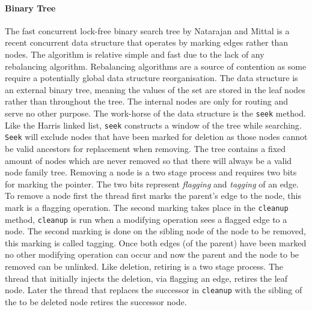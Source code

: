 \paragraph{Binary Tree} The fast concurrent lock-free binary search tree by Natarajan and Mittal is a recent concurrent data structure that operates by marking edges rather than nodes.\cite{LFBinaryTree} The algorithm is relative simple and fast due to the lack of any rebalancing algorithm. Rebalancing algorithms are a source of contention as some require a potentially global data structure reorganisation. The data structure is an external binary tree, meaning the values of the set are stored in the leaf nodes rather than throughout the tree. The internal nodes are only for routing and serve no other purpose. The work-horse of the data structure is the \texttt{seek} method. Like the Harris linked list, \texttt{seek} constructs a window of the tree while searching. \texttt{Seek} will exclude nodes that have been marked for deletion as those nodes cannot be valid ancestors for replacement when removing. The tree contains a fixed amount of nodes which are never removed so that there will always be a valid node family tree. Removing a node is a two stage process and requires two bits for marking the pointer. The two bits represent \textit{flagging} and \textit{tagging} of an edge. To remove a node first the thread first marks the parent's edge to the node, this mark is a flagging operation. The second marking takes place in the \texttt{cleanup} method, \texttt{cleanup} is run when a modifying operation sees a flagged edge to a node. The second marking is done on the sibling node of the node to be removed, this marking is called tagging. Once both edges (of the parent) have been marked no other modifying operation can occur and now the parent and the node to be removed can be unlinked. Like deletion, retiring is a two stage process. The thread that initially injects the deletion, via flagging an edge, retires the leaf node. Later the thread that replaces the successor in \texttt{cleanup} with the sibling of the to be deleted node retires the successor node.


